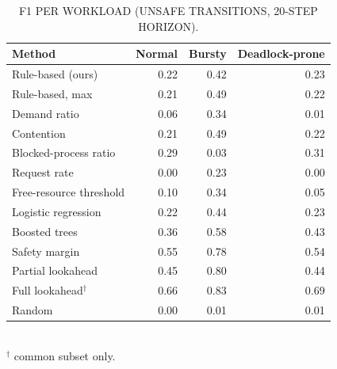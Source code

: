 \begin{table}[t]
\centering
\footnotesize
\caption{F1 PER WORKLOAD (UNSAFE TRANSITIONS, 20-STEP HORIZON).}
\label{tab:scenario}
\begin{tabular}{lrrr}
\toprule
Method & Normal & Bursty & Deadlock-prone \\
\midrule
Rule-based (ours) & 0.22 & 0.42 & 0.23 \\
Rule-based, max & 0.21 & 0.49 & 0.22 \\
Demand ratio & 0.06 & 0.34 & 0.01 \\
Contention & 0.21 & 0.49 & 0.22 \\
Blocked-process ratio & 0.29 & 0.03 & 0.31 \\
Request rate & 0.00 & 0.23 & 0.00 \\
Free-resource threshold & 0.10 & 0.34 & 0.05 \\
Logistic regression & 0.22 & 0.44 & 0.23 \\
Boosted trees & 0.36 & 0.58 & 0.43 \\
Safety margin & 0.55 & 0.78 & 0.54 \\
Partial lookahead & 0.45 & 0.80 & 0.44 \\
Full lookahead$^\dagger$ & 0.66 & 0.83 & 0.69 \\
Random & 0.00 & 0.01 & 0.01 \\
\bottomrule
\end{tabular}
\\[2pt]{\scriptsize $^\dagger$ common subset only.}
\end{table}
